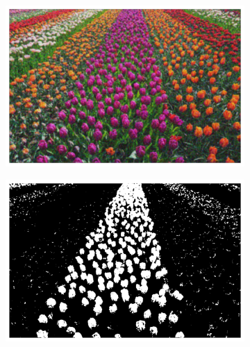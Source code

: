 \documentclass[11pt]{article}
\begin{document}
\begin{figure}[H]
    \centering
    \begin{subfigure}{.45\textwidth}  %
        \centering
        \includegraphics[width=\linewidth]{figs/q1b_denoised.png}
        \caption{}
        \label{fig:denoised_flowers}
    \end{subfigure}%
    \begin{subfigure}{.45\textwidth}  %
        \centering
        \includegraphics[width=\linewidth]{figs/q1b_kmeans_mask.png}
        \caption{}
        \label{fig:kmeans_mask_flowers}
    \end{subfigure}
    \begin{subfigure}{.45\textwidth}  %
        \centering

\end{subfigure}
\end{figure}
\end{document}
